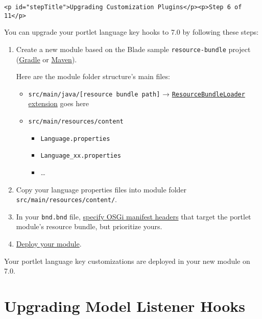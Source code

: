 \begin{verbatim}
<p id="stepTitle">Upgrading Customization Plugins</p><p>Step 6 of 11</p>
\end{verbatim}

You can upgrade your portlet language key hooks to 7.0 by following
these steps:

\begin{enumerate}
\def\labelenumi{\arabic{enumi}.}
\item
  Create a new module based on the Blade sample \texttt{resource-bundle}
  project
  (\href{https://github.com/liferay/liferay-blade-samples/tree/master/gradle/extensions/resource-bundle}{Gradle}
  or
  \href{https://github.com/liferay/liferay-blade-samples/tree/master/maven/extensions/resource-bundle}{Maven}).

  Here are the module folder structure's main files:

  \begin{itemize}
  \tightlist
  \item
    \texttt{src/main/java/{[}resource\ bundle\ path{]}} →
    \href{https://docs.liferay.com/dxp/portal/7.2-latest/javadocs/portal-kernel/}{\texttt{ResourceBundleLoader}
    extension} goes here
  \item
    \texttt{src/main/resources/content}

    \begin{itemize}
    \tightlist
    \item
      \texttt{Language.properties}
    \item
      \texttt{Language\_xx.properties}
    \item
      \ldots{}
    \end{itemize}
  \end{itemize}
\item
  Copy your language properties files into module folder
  \texttt{src/main/resources/content/}.
\item
  In your \texttt{bnd.bnd} file,
  \href{/docs/7-2/customization/-/knowledge_base/c/overriding-a-modules-language-keys}{specify
  OSGi manifest headers} that target the portlet module's resource
  bundle, but prioritize yours.
\item
  \href{/docs/7-2/reference/-/knowledge_base/r/deploying-a-project}{Deploy
  your module}.
\end{enumerate}

Your portlet language key customizations are deployed in your new module
on 7.0.

\chapter{Upgrading Model Listener
Hooks}\label{upgrading-model-listener-hooks}

